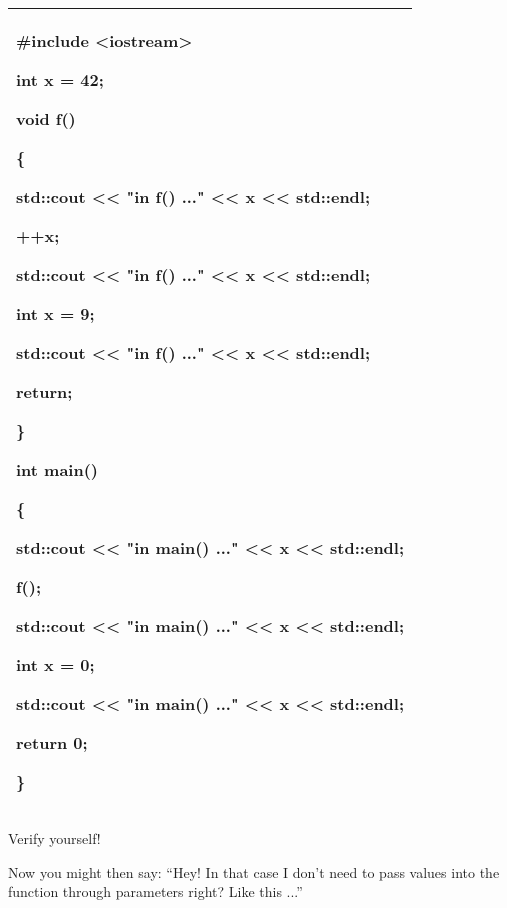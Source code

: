 \documentclass[
]{article}
\begin{document}
\begin{longtable}[]{@{}l@{}}
\toprule
\endhead
\begin{minipage}[t]{0.97\columnwidth}\raggedright
\#include \textless iostream\textgreater{}

int x = 42;

void f()

\{

std::cout \textless\textless{} "in f() ..." \textless\textless{} x
\textless\textless{} std::endl;

++x;

std::cout \textless\textless{} "in f() ..." \textless\textless{} x
\textless\textless{} std::endl;

int x = 9;

std::cout \textless\textless{} "in f() ..." \textless\textless{} x
\textless\textless{} std::endl;

return;

\}

int main()

\{

std::cout \textless\textless{} "in main() ..." \textless\textless{} x
\textless\textless{} std::endl;

f();

std::cout \textless\textless{} "in main() ..." \textless\textless{} x
\textless\textless{} std::endl;

int x = 0;

std::cout \textless\textless{} "in main() ..." \textless\textless{} x
\textless\textless{} std::endl;

return 0;

\}\strut
\end{minipage}\tabularnewline
\bottomrule
\end{longtable}

Verify yourself!

Now you might then say: ``Hey! In that case I don't need to pass values
into the function through parameters right? Like this ...''
\end{document}
